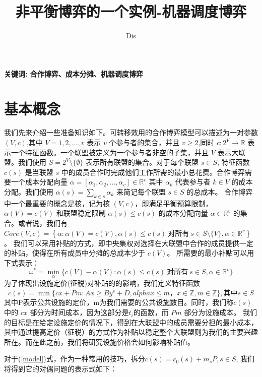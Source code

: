 \documentclass[UTF8]{article}
\author {Dis \cdot {count}}
\title {非平衡博弈的一个实例-机器调度博弈}
\date{}
\begin{document}
    \maketitle


\qquad \textbf{关键词: 合作博弈、成本分摊、机器调度博弈}

\section{基本概念}
我们先来介绍一些准备知识如下。可转移效用的合作博弈模型可以描述为一对参数 $(V,c)$,其中 $V={1,2,\dots,v}$ 表示 $v$ 个参与者的集合，并且 $v\geq2$,同时
$c:2^{V}\to \mathbb{R}$ 表示一个特征函数。一个联盟被定义为一个参与者非空的子集，并且 $V$ 表示大联盟。我们使用 $S=2^{V} \setminus\{\emptyset\}$ 表示所有联盟的集合。对于每个联盟 $s\in S$, 特征函数 $c(s)$ 是当联盟 $s$ 中的成员合作时完成他们工作所需的最小总花费。合作博弈需要一个成本分配向量 $\alpha=[\alpha_{1},\alpha_{2},\dots,\alpha_{v}] \in \mathbb{R}^{v}$ 其中 $\alpha_{k}$ 代表参与者 $k \in V$ 的成本分配。我们使用 $\alpha(s)=\sum_{k\in{s}}\alpha_{k}$ 来简记每个联盟 $s\in S$ 的总成本。
合作博弈中一个最重要的概念是核，记为核 $(V,c)$，即满足平衡预算限制，$\alpha(V)=c(V)$ 和联盟稳定限制 $\alpha(s) \leq c(s)$ 的成本分配向量 $\alpha\in\mathbb{R}^{v}$ 的集合。或者说，我们有 $Core(V,c)= \left\{\alpha:\alpha(V)=c(V), \alpha(s)\leq c(s)\ \text{对所有}\ s \in S \setminus\{V\}, \alpha \in \mathbb{R}^{v} \right\}$。
我们可以采用补贴的方式，即中央集权对选择在大联盟中合作的成员提供一定的补贴，使得在所有成员中分摊的总成本少于 $c(V)$。
所需要的最小补贴可以用下式表示：
\begin{equation} \label{model}
  \omega^*=\mathop{\min}_{\alpha}\{c(V)-\alpha(V):\alpha(s)\leq c(s)\ \text{对所有}\ s \in S, \alpha\in\mathbb{R}^{v}\}
\end{equation}
为了体现出设施定价(征税)对补贴的的影响，我们定义特征函数
\[
c(s)=\mathop{\min}\{cx+Pm:Ax \geq By^s+D, \tilde{alpha}x \leq m，x \in \mathbb{Z} ,m \in \mathbb{Z}\} ,\text{其中} s \in S
\]
其中P表示公共设施的定价，m为我们需要的公共设施数目。同时，我们称$c(s)$中的 $cx$ 部分为时间成本，因为这部分是$t_i$的函数，而 $Pm$ 部分为设施成本。
我们的目标是在给定设施定价的情况下，得到在大联盟中的成员需要分担的最小成本，其中通过提高定价（征税）的方式作为补贴以稳定整个大联盟则为我们的主要兴趣所在。而在此之前，我们将研究设施价格会如何影响补贴值。

对于(\ref{model})式，作为一种常用的技巧，拆分$c(s)=c_0(s)+m_sP, s \in S$, 我们将得到它的对偶问题的表示式如下：
\end{document}
